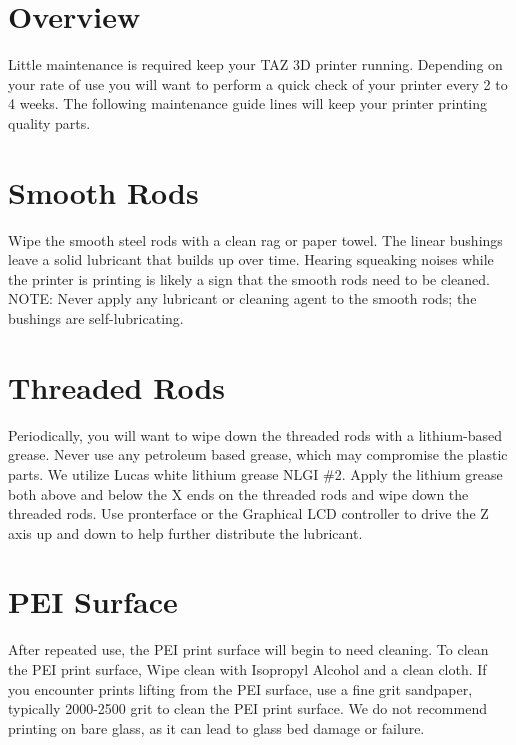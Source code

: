 %
%
%
%
%

\section{Overview}
Little maintenance is required keep your TAZ 3D printer running. Depending on your rate of use you will want to perform a quick check of your printer every 2 to 4 weeks. The following maintenance guide lines will keep your printer printing quality parts.

\section{Smooth Rods}
Wipe the smooth steel rods with a clean rag or paper towel. The linear bushings leave a solid lubricant that builds up over time. Hearing squeaking noises while the printer is printing is likely a sign that the smooth rods need to be cleaned. NOTE: Never apply any lubricant or cleaning agent to the smooth rods; the bushings are self-lubricating.

\section{Threaded Rods}
Periodically, you will want to wipe down the threaded rods with a lithium-based grease. Never use any petroleum based grease, which may compromise the plastic parts. We utilize Lucas white lithium grease NLGI \#2. Apply the lithium grease both above and below the X ends on the threaded rods and wipe down the threaded rods. Use pronterface or the Graphical LCD controller to drive the Z axis up and down to help further distribute the lubricant.

\section{PEI Surface}
After repeated use, the PEI print surface will begin to need cleaning. To clean the PEI print surface, Wipe clean with Isopropyl Alcohol and a clean cloth. If you encounter prints lifting from the PEI surface, use a fine grit sandpaper, typically 2000-2500 grit to clean the PEI print surface. We do not recommend printing on bare glass, as it can lead to glass bed damage or failure.

